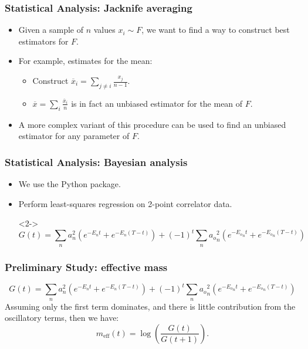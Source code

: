 \documentclass{beamer}
\begin{document}
\begin{frame}
\frametitle{Statistical Analysis: Jacknife averaging}
\begin{itemize}
    \item<1-> Given a sample of $n$ values $x_i \sim F$, we want to find a way to construct best estimators for $F$.
    \item<2-> For example, estimates for the mean:
        \begin{itemize}
            \item Construct $\overline{x}_i = \sum_{j\neq i} \frac{x_j}{n-1}$.
            \item $\overline{x} = \sum_i\frac{\overline{x}_i}{n}$ is in fact an unbiased estimator for the mean of $F$.
        \end{itemize}
    \item<3-> A more complex variant of this procedure can be used to find an unbiased estimator for any parameter of $F$\cite{efron1982jackknife}.
\end{itemize}
\end{frame}

\begin{frame}
    \frametitle{Statistical Analysis: Bayesian analysis}
    \begin{itemize}
        \item<1-> We use the \cite{lepage2020corrfitter} Python package.
        \item<2-> Perform least-squares regression on 2-point correlator data.
        \item[]<2-> 
            \begin{equation*}
                G(t) = \sum_n a_n^2 (e^{-E_n t} + e^{-E_n(T-t)}) + {(-1)}^t \sum_n {a_o}_n^2 (e^{-{E_o}_n t} + e^{{-E_o}_n (T-t)})
            \end{equation*}
\end{itemize}
\end{frame}

\begin{frame}
    \frametitle{Preliminary Study: effective mass}
    \begin{equation*}
        G(t) = \sum_n a_n^2 (e^{-E_n t} + e^{-E_n(T-t)}) + {(-1)}^t \sum_n {a_o}_n^2 (e^{-{E_o}_n t} + e^{{-E_o}_n (T-t)})
    \end{equation*}
    Assuming only the first term dominates, and there is little contribution from the oscillatory terms, then we have:
    \begin{equation*}
        m_{\mathrm{eff}}(t) = \log(\frac{G(t)}{G(t+1)}).
    \end{equation*}
\end{frame}
\end{document}

